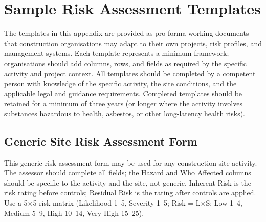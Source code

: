 \chapter{Sample Risk Assessment Templates}
\label{chap:Sample Risk Assessment Templates}

The templates in this appendix are provided as pro-forma working documents that construction organisations may adapt to their own projects, risk profiles, and management systems. Each template represents a minimum framework; organisations should add columns, rows, and fields as required by the specific activity and project context. All templates should be completed by a competent person with knowledge of the specific activity, the site conditions, and the applicable legal and guidance requirements. Completed templates should be retained for a minimum of three years (or longer where the activity involves substances hazardous to health, asbestos, or other long-latency health risks).

\section{Generic Site Risk Assessment Form}

This generic risk assessment form may be used for any construction site activity. The assessor should complete all fields; the Hazard and Who Affected columns should be specific to the activity and the site, not generic. Inherent Risk is the risk rating before controls; Residual Risk is the rating after controls are applied. Use a 5$\times$5 risk matrix (Likelihood 1--5, Severity 1--5; Risk = L$\times$S; Low 1--4, Medium 5--9, High 10--14, Very High 15--25).

